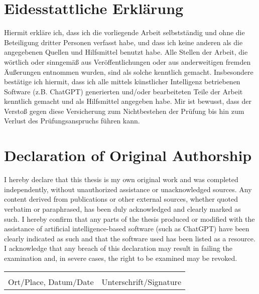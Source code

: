 	
	\section*{Eidesstattliche Erklärung}
	
	Hiermit erkläre ich, dass ich die vorliegende Arbeit selbstständig und ohne die Beteiligung dritter Personen verfasst habe, und dass ich keine anderen als die angegebenen Quellen und Hilfsmittel benutzt habe.
	Alle Stellen der Arbeit, die wörtlich oder sinngemäß aus Veröffentlichungen oder aus anderweitigen fremden Äußerungen entnommen wurden, sind als solche kenntlich gemacht.
	Insbesondere bestätige ich hiermit, dass ich alle mittels künstlicher Intelligenz betriebenen Software (z.B. ChatGPT) generierten und/oder bearbeiteten Teile der Arbeit kenntlich gemacht und als Hilfsmittel angegeben habe.
	Mir ist bewusst, dass der Verstoß gegen diese Versicherung zum Nichtbestehen der Prüfung bis hin zum Verlust des Prüfungsanspruchs führen kann.
	
	\section*{Declaration of Original Authorship}
	
	I hereby declare that this thesis is my own original work and was completed independently, without unauthorized assistance or unacknowledged sources.
	Any content derived from publications or other external sources, whether quoted verbatim or paraphrased, has been duly acknowledged and clearly marked as such.
	I hereby confirm that any parts of the thesis produced or modified with the assistance of artificial intelligence-based software (such as ChatGPT) have been clearly indicated as such and that the software used has been listed as a resource.
	I acknowledge that any breach of this declaration may result in failing the examination and, in severe cases, the right to be examined may be revoked.
	
	\vspace*{\fill}
	
	\noindent\begin{tabular}{ll}
		\makebox[2.5in]{\hrulefill} & \makebox[2.5in]{\hrulefill}\\
		Ort/Place, Datum/Date & Unterschrift/Signature\\[8ex]
	\end{tabular}
	\restoregeometry
